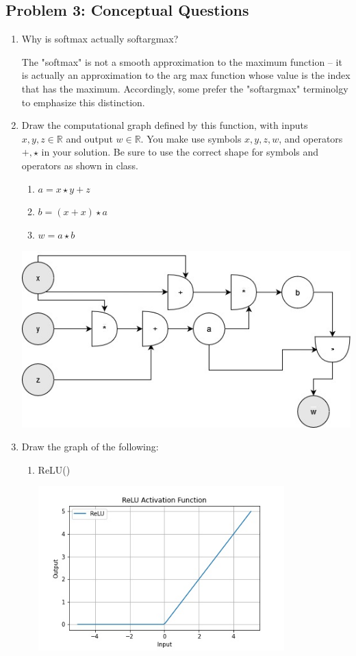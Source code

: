 \documentclass{article}
\begin{document}
\subsection*{Problem 3: Conceptual Questions}
%
\begin{enumerate}
  \item Why is softmax actually softargmax?
        \begin{tcolorbox}
          The "softmax" is not a smooth approximation to the maximum function -- it
          is actually an approximation to the arg max function whose value is the index
          that has the maximum. Accordingly, some prefer the "softargmax" terminolgy to
          emphasize this distinction.
        \end{tcolorbox}
  \item Draw the computational graph defined by this function, with inputs $x,
          y, z \in \mathbb{R}$ and output $w \in \mathbb{R}$. You make use symbols $x, y,
          z,w$, and operators $+,\star$ in your solution. Be sure to use the correct
        shape for symbols and
        operators as shown in class.
        \begin{enumerate}
          \item $a = x \star y + z  $
          \item $b = (x+x) \star a$
          \item $w = a \star b$
        \end{enumerate}
        \includegraphics[width=15cm]{"diagram.jpg"}
  \item Draw the graph of the following:
        \begin{enumerate}
          \item ReLU()
                \begin{tcolorbox}
                  \includegraphics[width=9.5cm]{relu.jpg}

\end{tcolorbox}
\end{enumerate}
\end{enumerate}
\end{document}
